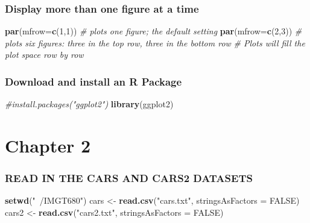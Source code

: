\documentclass[11pt,]{article}
\newenvironment{Shaded}{\begin{snugshade}}{\end{snugshade}}
\newcommand{\CommentTok}[1]{\textcolor[rgb]{0.56,0.35,0.01}{\textit{#1}}}
\newcommand{\DataTypeTok}[1]{\textcolor[rgb]{0.13,0.29,0.53}{#1}}
\newcommand{\DecValTok}[1]{\textcolor[rgb]{0.00,0.00,0.81}{#1}}
\newcommand{\KeywordTok}[1]{\textcolor[rgb]{0.13,0.29,0.53}{\textbf{#1}}}
\newcommand{\NormalTok}[1]{#1}
\newcommand{\OtherTok}[1]{\textcolor[rgb]{0.56,0.35,0.01}{#1}}
\newcommand{\StringTok}[1]{\textcolor[rgb]{0.31,0.60,0.02}{#1}}
\begin{document}
\hypertarget{display-more-than-one-figure-at-a-time}{%
\subsubsection{Display more than one figure at a
time}\label{display-more-than-one-figure-at-a-time}}

\begin{Shaded}
\begin{Highlighting}[]
  \KeywordTok{par}\NormalTok{(}\DataTypeTok{mfrow=}\KeywordTok{c}\NormalTok{(}\DecValTok{1}\NormalTok{,}\DecValTok{1}\NormalTok{)) }\CommentTok{# plots one figure; the default setting}
  \KeywordTok{par}\NormalTok{(}\DataTypeTok{mfrow=}\KeywordTok{c}\NormalTok{(}\DecValTok{2}\NormalTok{,}\DecValTok{3}\NormalTok{)) }\CommentTok{# plots six figures: three in the top row, three in the bottom row}
  \CommentTok{# Plots will fill the plot space row by row}
\end{Highlighting}
\end{Shaded}

\hypertarget{download-and-install-an-r-package}{%
\subsubsection{Download and install an R
Package}\label{download-and-install-an-r-package}}

\begin{Shaded}
\begin{Highlighting}[]
  \CommentTok{#install.packages("ggplot2")}
  \KeywordTok{library}\NormalTok{(ggplot2)}
\end{Highlighting}
\end{Shaded}

\hypertarget{chapter-2}{%
\section{Chapter 2}\label{chapter-2}}

\hypertarget{read-in-the-cars-and-cars2-datasets}{%
\subsubsection{READ IN THE CARS AND CARS2
DATASETS}\label{read-in-the-cars-and-cars2-datasets}}

\begin{Shaded}
\begin{Highlighting}[]
  \KeywordTok{setwd}\NormalTok{(}\StringTok{"~/IMGT680"}\NormalTok{)}
\NormalTok{  cars <-}\StringTok{ }\KeywordTok{read.csv}\NormalTok{(}\StringTok{"cars.txt"}\NormalTok{, }\DataTypeTok{stringsAsFactors =} \OtherTok{FALSE}\NormalTok{)}
\NormalTok{  cars2 <-}\StringTok{ }\KeywordTok{read.csv}\NormalTok{(}\StringTok{"cars2.txt"}\NormalTok{, }\DataTypeTok{stringsAsFactors =} \OtherTok{FALSE}\NormalTok{)}
\end{Highlighting}
\end{Shaded}
\end{document}
